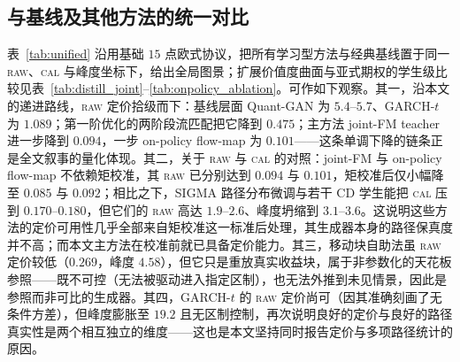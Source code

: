 \documentclass[11pt]{ctexart}
\newcommand{\raw}{\textsc{raw}}
\newcommand{\caltext}{\textsc{cal}}
\begin{document}
\subsection{与基线及其他方法的统一对比}
\label{sec:res_baselines}
表~\ref{tab:unified} 沿用基础 $15$ 点欧式协议，把所有学习型方法与经典基线置于同一 \raw{}、\caltext{} 与峰度坐标下，给出全局图景；扩展价值度曲面与亚式期权的学生级比较见表~\ref{tab:distill_joint}--\ref{tab:onpolicy_ablation}。可作如下观察。其一，沿本文的递进路线，\raw{} 定价拾级而下：基线层面 Quant-GAN 为 $5.4$--$5.7$、GARCH-$t$ 为 $1.089$；第一阶优化的两阶段流匹配把它降到 $0.475$；主方法 joint-FM teacher 进一步降到 $0.094$，一步 on-policy flow-map 为 $0.101$——这条单调下降的链条正是全文叙事的量化体现。其二，关于 \raw{} 与 \caltext{} 的对照：joint-FM 与 on-policy flow-map 不依赖矩校准，其 \raw{} 已分别达到 $0.094$ 与 $0.101$，矩校准后仅小幅降至 $0.085$ 与 $0.092$；相比之下，SIGMA 路径分布微调与若干 CD 学生能把 \caltext{} 压到 $0.170$--$0.180$，但它们的 \raw{} 高达 $1.9$--$2.6$、峰度坍缩到 $3.1$--$3.6$。这说明这些方法的定价可用性几乎全部来自矩校准这一标准后处理，其生成器本身的路径保真度并不高；而本文主方法在校准前就已具备定价能力。其三，移动块自助法虽 \raw{} 定价较低（$0.269$，峰度 $4.58$），但它只是重放真实收益块，属于非参数化的天花板参照——既不可控（无法被驱动进入指定区制），也无法外推到未见情景，因此是参照而非可比的生成器。其四，GARCH-$t$ 的 \raw{} 定价尚可（因其准确刻画了无条件方差），但峰度膨胀至 $19.2$ 且无区制控制，再次说明良好的定价与良好的路径真实性是两个相互独立的维度——这也是本文坚持同时报告定价与多项路径统计的原因。
\end{document}
